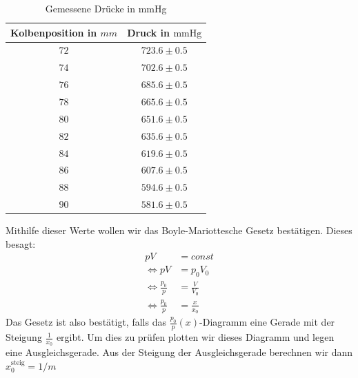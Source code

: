 \documentclass{report}
\begin{document}
\begin{table}[H]
        \begin{center}
                \begin{tabular}{|c|c|}
                        \hline
                        Kolbenposition in $mm$ & Druck in $\mathrm{mmHg}$ \\
                        \hline
                        $72$ & $723.6 \pm 0.5$ \\
                        \hline
                        $74$ & $702.6 \pm 0.5$ \\
                        \hline
                        $76$ & $685.6 \pm 0.5$ \\
                        \hline
                        $78$ & $665.6 \pm 0.5$ \\
                        \hline
                        $80$ & $651.6 \pm 0.5$ \\
                        \hline
                        $82$ & $635.6 \pm 0.5$ \\
                        \hline
                        $84$ & $619.6 \pm 0.5$ \\
                        \hline
                        $86$ & $607.6 \pm 0.5$ \\
                        \hline
                        $88$ & $594.6 \pm 0.5$ \\
                        \hline
                        $90$ & $581.6 \pm 0.5$ \\
                        \hline
                \end{tabular}
        \end{center}
        \caption{Gemessene Drücke in mmHg}
        \label{tab:IsoThermExpPmmHg}
\end{table}
Mithilfe dieser Werte wollen wir das Boyle-Mariottesche Gesetz bestätigen.
Dieses besagt:
\begin{equation}
    \begin{split}
        pV &= const \\
        \Leftrightarrow pV &= p_0 V_0 \\
        \Leftrightarrow \frac{p_0}{p} &= \frac{V}{V_0} \\
        \Leftrightarrow \frac{p_0}{p} &= \frac{x}{x_0}
    \end{split}
\end{equation}
Das Gesetz ist also bestätigt, falls das $\frac{p_0}{p}(x)$-Diagramm eine Gerade mit der Steigung $\frac{1}{x_0}$ ergibt.
Um dies zu prüfen plotten wir dieses Diagramm und legen eine Ausgleichsgerade. Aus der Steigung der Ausgleichsgerade berechnen wir dann $x_0^{\mathrm{steig}} = 1/m$
\end{document}
